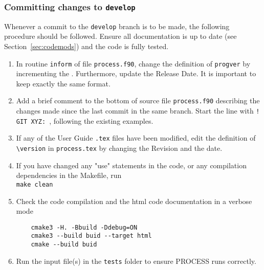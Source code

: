 \documentclass[11pt,a4paper]{report}
\newcommand{\version}{
15 July 2019
\hfill
PROCESS version: 1.0.16
}
\begin{document}
\subsubsection{Committing changes to \texttt{develop}}

Whenever a commit to the \texttt{develop} branch is to be made, the following
procedure should be followed. Ensure all documentation is up to date (see
Section~\ref{sec:codemods}) and the code is fully tested.
\begin{enumerate}

\item In routine \texttt{inform} of file \texttt{process.f90}, change the
  definition of \texttt{progver} by incrementing the . Furthermore, update the Release Date. It is important to keep exactly the same format.

\item Add a brief comment to the bottom of source file \texttt{process.f90}
  describing the changes made since the last commit in the same branch. Start
  the line with \texttt{! GIT XYZ: }, following the existing examples.

\item If any of the User Guide \texttt{.tex} files have been modified, edit
  the definition of \verb+\version+ in \texttt{process.tex} by changing the
  Revision  and the date.

\item If you have changed any "use" statements in the code, or any compilation dependencies in the Makefile, run \\
\texttt{make clean}

\item Check the code compilation and the html code documentation in a verbose mode
\begin{center}
	\begin{verbatim}
	cmake3 -H. -Bbuild -Ddebug=ON
	cmake3 --build buid --target html
	cmake --build buid
	\end{verbatim}
\end{center}

\item Run the input file(s) in the \texttt{tests} folder to ensure PROCESS runs correctly.


\end{enumerate}
\end{document}
